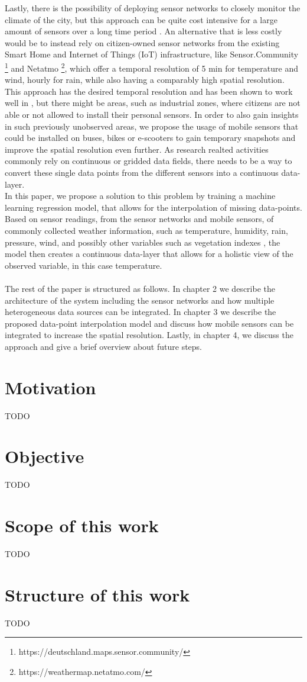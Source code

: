 Lastly, there is the possibility of deploying sensor networks to closely monitor the climate of the city, but this approach can be quite cost intensive for a large amount of sensors over a long time period \cite{chapman2015birmingham}. An alternative that is less costly would be to instead rely on citizen-owned sensor networks from the existing Smart Home and Internet of Things (IoT) infrastructure, like Sensor.Community \footnote{https://deutschland.maps.sensor.community/} and Netatmo \footnote{https://weathermap.netatmo.com/}, which offer a temporal resolution of 5 min for temperature and wind, hourly for rain, while also having a comparably high spatial resolution. This approach has the desired temporal resolution and has been shown to work well in \cite{meier2017crowdsourcing}, but there might be areas, such as industrial zones, where citizens are not able or not allowed to install their personal sensors. In order to also gain insights in such previously unobserved areas, we propose the usage of mobile sensors that could be installed on buses, bikes or e-scooters to gain temporary snapshots and improve the spatial resolution even further.
As research realted activities commonly rely on continuous or gridded data fields, there needs to be a way to convert these single data points from the different sensors into a continuous data-layer.\\
In this paper, we propose a solution to this problem by training a machine learning regression model, that allows for the interpolation of missing data-points. Based on sensor readings, from the sensor networks and mobile sensors, of commonly collected weather information, such as temperature, humidity, rain, pressure, wind, and possibly other variables such as vegetation indexes \cite{alonso2020new}, the model then creates a continuous data-layer that allows for a holistic view of the observed variable, in this case temperature.\\
\\
The rest of the paper is structured as follows. In chapter 2 we describe the architecture of the system including the sensor networks and how multiple heterogeneous data sources can be integrated. In chapter 3 we describe the proposed data-point interpolation model and discuss how mobile sensors can be integrated to increase the spatial resolution. Lastly, in chapter 4, we discuss the approach and give a brief overview about future steps.

\section{Motivation}
\label{ch:1}

TODO

\section{Objective}

TODO

\section{Scope of this work}
\label{ch:eingrenzungThema}

TODO

\section{Structure of this work} 

TODO
